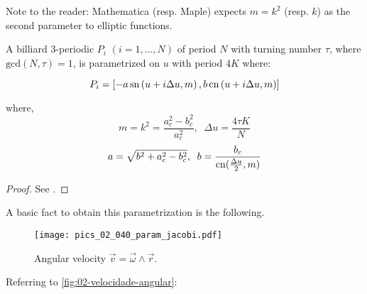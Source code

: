\begin{remark}
Note to the reader: Mathematica (resp. Maple) expects $m=k^2$ (resp. $k$) as the second parameter to elliptic functions.




\end{remark}

\begin{theorem}
A billiard 3-periodic $P_i$ $(i=1,\ldots, N) $ of period $N$  with turning number $\tau$, where $\mathrm{gcd}(N,\tau) =1$,  is parametrized on $u$ with period $4K$ where:


\[ 
P_i=
\left[-a\,\mathrm{sn}  \left(u+ i \Delta{u},  {m} \right) , b\,\mathrm{cn}  \left(u + i \Delta{u}, { m} \right)\right]
\]

where,
\[ m=k^2=\frac{a_c^2-b_c^2}{a_c^2},\;\;\Delta{u}=\frac{4\tau K}{N}\]
\[a= \sqrt{b^2+ a_c^2-b_c^2}, \;\; b=\frac{b_c}{\mathrm{cn}(\frac{\Delta{u}}{2}, m)}\]
\end{theorem}
\begin{proof} See \cite{stachel2021-billiards}.\end{proof}

A basic fact to obtain this parametrization is the following.

\begin{figure}
    \centering
    \texttt{[image: pics\_02\_040\_param\_jacobi.pdf]}
    \caption{ Angular velocity $\vec v=\vec \omega\wedge \vec r$. } 
    \end{figure}
Referring to \cref{fig:02-velocidade-angular}:

